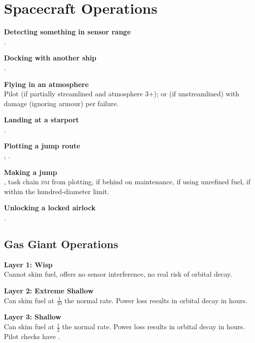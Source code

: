 \documentclass{cheatsheet}
\begin{document}
\section{Spacecraft Operations}

\begin{multicols}{3}
\begin{emphbox}
\textbf{Detecting something in sensor range}\\
.

\textbf{Docking with another ship}\\
.

\textbf{Flying in an atmosphere}\\
Pilot  (if partially streamlined and atmosphere 3+); or
 (if unstreamlined) with  damage (ignoring armour)
per failure.

\textbf{Landing at a starport}\\
.

\textbf{Plotting a jump route}\\
, .

\textbf{Making a jump}\\
, task chain \textsc{dm}
from plotting,  if behind on maintenance, 
if using unrefined fuel,  if within the hundred-diameter
limit.

\textbf{Unlocking a locked airlock}\\
.
\end{emphbox}

\subsection{Gas Giant Operations}

\textbf{Layer 1: Wisp}\\
Cannot skim fuel, offers no sensor interference, no real risk of
orbital decay.

\textbf{Layer 2: Extreme Shallow}\\
Can skim fuel at $\frac{1}{10}$ the normal rate.  Power loss results
in orbital decay in  hours.

\textbf{Layer 3: Shallow}\\
Can skim fuel at $\frac{1}{2}$ the normal rate.  Power loss results in
orbital decay in  hours.  Pilot checks have .


\end{multicols}
\end{document}
